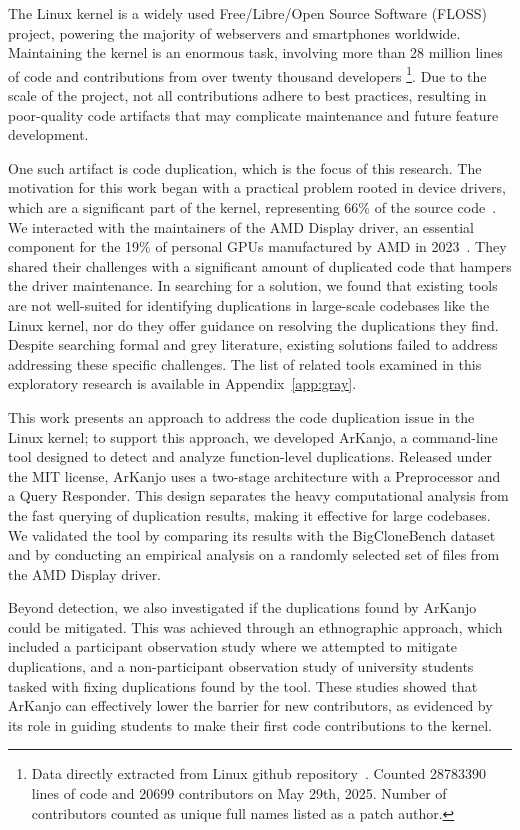 \en

The Linux kernel is a widely used Free/Libre/Open Source Software (FLOSS) project,
powering the majority of webservers and smartphones worldwide.
Maintaining the kernel is an enormous task, involving more than 28 million lines of 
code and contributions from over twenty thousand developers
\footnote{Data directly extracted from Linux github repository~\citep{linuxrepo}.
Counted  28783390 lines of code and 20699 contributors on May 29th, 2025.
Number of contributors counted as unique full names listed as a patch author.}.
Due to the scale of the project, not all contributions adhere to best practices, resulting 
in poor-quality code artifacts that may complicate maintenance and future feature development.

One such artifact is code duplication, which is the focus of this research. The motivation for 
this work began with a practical problem rooted in device drivers, which are a significant part 
of the kernel, representing 66\% of the source code~\citep{marcelo}. We interacted with the 
maintainers of the AMD Display driver, an essential component for the 19\% of personal GPUs 
manufactured by AMD in 2023~\citep{gpumarket}. They shared their challenges with a significant 
amount of duplicated code that hampers the driver maintenance. In searching for a solution, 
we found that existing tools are not well-suited for identifying duplications in large-scale 
codebases like the Linux kernel, nor do they offer guidance on resolving the duplications 
they find. Despite searching formal and grey literature, existing solutions failed to address
addressing these specific challenges. The list of related tools examined in this exploratory 
research is available in Appendix~\ref{app:gray}.

This work presents an approach to address the code duplication issue in the Linux kernel; to 
support this approach, we developed ArKanjo, a command-line tool designed to detect and analyze 
function-level duplications. Released under the MIT license, ArKanjo uses a two-stage 
architecture with a Preprocessor and a Query Responder. This design separates the heavy 
computational analysis from the fast querying of duplication results, making it effective for 
large codebases. We validated the tool by comparing its results with the BigCloneBench
dataset~\citep{bigclonebench} and by conducting an empirical analysis on a randomly selected set of 
files from the AMD Display driver.

Beyond detection, we also investigated if the duplications found by ArKanjo could be mitigated.
This was achieved through an ethnographic approach, which included a participant observation 
study where we attempted to mitigate duplications, and a non-participant observation study of 
university students tasked with fixing duplications found by the tool. These studies showed that 
ArKanjo can effectively lower the barrier for new contributors, as evidenced by its role in 
guiding students to make their first code contributions to the kernel.

